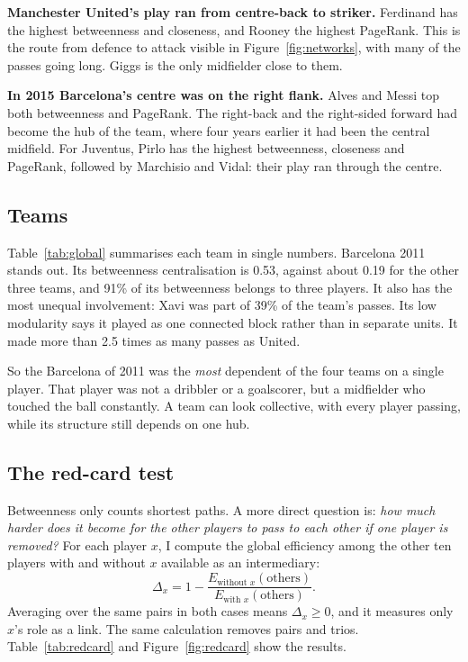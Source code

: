 \documentclass[11pt,a4paper]{article}
\begin{document}
\textbf{Manchester United's play ran from centre-back to striker.} Ferdinand has the highest betweenness and closeness, and Rooney the highest PageRank. This is the route from defence to attack visible in Figure~\ref{fig:networks}, with many of the passes going long. Giggs is the only midfielder close to them.

\textbf{In 2015 Barcelona's centre was on the right flank.} Alves and Messi top both betweenness and PageRank. The right-back and the right-sided forward had become the hub of the team, where four years earlier it had been the central midfield. For Juventus, Pirlo has the highest betweenness, closeness and PageRank, followed by Marchisio and Vidal: their play ran through the centre.



\subsection{Teams}\label{sec:team}

Table~\ref{tab:global} summarises each team in single numbers. Barcelona 2011 stands out. Its betweenness centralisation is 0.53, against about 0.19 for the other three teams, and 91\% of its betweenness belongs to three players. It also has the most unequal involvement: Xavi was part of 39\% of the team's passes. Its low modularity says it played as one connected block rather than in separate units. It made more than 2.5 times as many passes as United.

So the Barcelona of 2011 was the \emph{most} dependent of the four teams on a single player. That player was not a dribbler or a goalscorer, but a midfielder who touched the ball constantly. A team can look collective, with every player passing, while its structure still depends on one hub.



\subsection{The red-card test}\label{sec:redcard}

Betweenness only counts shortest paths. A more direct question is: \emph{how much harder does it become for the other players to pass to each other if one player is removed?} For each player $x$, I compute the global efficiency among the other ten players with and without $x$ available as an intermediary:
\[
\Delta_x = 1 - \frac{E_{\text{without } x}(\text{others})}{E_{\text{with } x}(\text{others})} .
\]
Averaging over the same pairs in both cases means $\Delta_x \ge 0$, and it measures only $x$'s role as a link. The same calculation removes pairs and trios. Table~\ref{tab:redcard} and Figure~\ref{fig:redcard} show the results.
\end{document}
